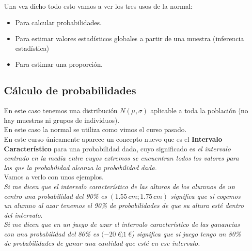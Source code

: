\documentclass[a4paper,10pt,answers]{exam}
\begin{document}
Una vez dicho todo esto vamos a ver los tres usos de la normal:
\begin{itemize}
	\item Para calcular probabilidades.
	\item Para estimar valores estadísticos globales a partir de una muestra (inferencia estadística)
	\item Para estimar una proporción.
\end{itemize}
\subsection*{Cálculo de probabilidades}
En este caso tenemos una distribución $N(\mu, \sigma)$ aplicable a toda la población (no hay muestras ni grupos de individuos).\\
En este caso la normal se utiliza como vimos el curso pasado.\\

En este curso únicamente aparece un concepto nuevo que es el \textbf{Intervalo Característico} para una probabilidad dada, cuyo significado es \emph{el intervalo centrado en la media entre cuyos extremos se encuentran todos los valores para los que la probabilidad alcanza la probabilidad dada.}\\
Vamos a verlo con unos ejemplos.\\

\emph {Si me dicen que el intervalo característico de las alturas de los alumnos de un centro una probabilidad del 90\% es $(1.55\,cm; 1.75\,cm)$  significa que si cogemos un alumno al azar tenemos el 90\% de probabilidades de que su altura esté dentro del intervalo}.\\


\emph {Si me dicen que en un juego de azar el intervalo característico de las ganancias con una probabilidad del 80\% es $(-20$\,€;$ 1$\,€) significa que si juego tengo un 80\% de probabilidades de ganar una cantidad que esté en ese intervalo.}\\
\end{document}
